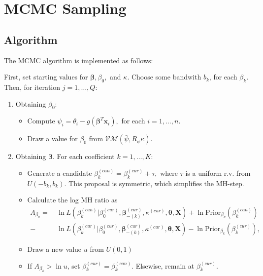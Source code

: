 \documentclass{article}\usepackage[]{graphicx}\usepackage[]{color}
\begin{document}
\newpage

\section{MCMC Sampling}

\subsection{Algorithm}

The MCMC algorithm is implemented as follows:

First, set starting values for $\boldsymbol\beta, \beta_0,$ and $\kappa$. Choose some bandwith $b_k$, for each $\beta_k$. Then, for iteration $j = 1, \dots, Q$:

\begin{enumerate}

\item Obtaining $\beta_0$:
\begin{itemize}
\item Compute $\psi_i = \theta_i - g(\boldsymbol\beta^T \boldsymbol{x}_i),$ for each $i = 1, \dots, n. $
\item Draw a value for $\beta_0$ from $\mathcal{VM}(\bar\psi, R_{\psi} \kappa).$
\end{itemize}

\item Obtaining $\boldsymbol\beta$. For each coefficient $k = 1, \dots, K$:
\begin{itemize}
\item Generate a candidate $\beta_k^{(can)} = \beta_k^{(cur)} + \tau,$ where $\tau$ is a uniform r.v. from $U(-b_k, b_k)$. This proposal is symmetric, which simplifies the MH-step.
\item Calculate the log MH ratio as
\begin{align*}
A_{\beta_k} = ~& \ln L \left( \beta_{k}^{(can)} \vert \beta_0^{(cur)}, \boldsymbol\beta_{-(k)}^{(cur)}, \kappa^{(cur)}, \boldsymbol\theta, \boldsymbol{X} \right) + \ln \text{Prior}_{\beta_k}\left(\beta_{k}^{(can)}\right) \\
- & \ln L \left( \beta_{k}^{(cur)} \vert \beta_0^{(cur)}, \boldsymbol\beta_{-(k)}^{(cur)}, \kappa^{(cur)}, \boldsymbol\theta, \boldsymbol{X} \right) - \ln \text{Prior}_{\beta_k}\left(\beta_{k}^{(cur)}\right),
\end{align*}
\item Draw a new value $u$ from $U(0,1)$
\item If $ A_{\beta_k} > \ln u $, set $\beta_k^{(cur)} = \beta_k^{(can)}$. Elsewise, remain at $\beta_k^{(cur)}$.
\end{itemize}


\end{enumerate}
\end{document}
